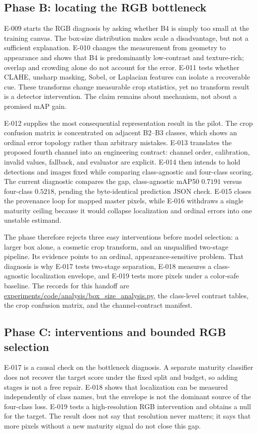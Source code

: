 \documentclass[preprint,12pt]{elsarticle}
\newcommand{\pathcode}[1]{\scriptsize\url{#1}}
\newcommand{\mAP}{mAP}
\begin{document}
\subsection{Phase B: locating the RGB bottleneck}
E-009 starts the RGB diagnosis by asking whether B4 is simply too small at the
training canvas. The box-size distribution makes scale a disadvantage, but
not a sufficient explanation. E-010 changes the measurement from geometry to
appearance and shows that B4 is predominantly low-contrast and texture-rich;
overlap and crowding alone do not account for the error. E-011 tests whether
CLAHE, unsharp masking, Sobel, or Laplacian features can isolate a recoverable
cue. These transforms change measurable crop statistics, yet no transform
result is a detector intervention. The claim remains about mechanism, not
about a promised mAP gain.

E-012 supplies the most consequential representation result in the pilot.
The crop confusion matrix is concentrated on adjacent B2--B3 classes, which
shows an ordinal error topology rather than arbitrary mistakes. E-013 translates
the proposed fourth channel into an engineering contract: channel order,
calibration, invalid values, fallback, and evaluator are explicit. E-014 then
intends to hold detections and images fixed while comparing class-agnostic and
four-class scoring. The current diagnostic compares the gap, class-agnostic
\mAP50 \(0.7191\) versus four-class \(0.5218\), pending the
byte-identical prediction JSON check. E-015 closes the provenance loop for mapped master
pixels, while E-016 withdraws a single maturity ceiling because it would
collapse localization and ordinal errors into one unstable estimand.

The phase therefore rejects three easy interventions before model selection:
a larger box alone, a cosmetic crop transform, and an unqualified two-stage
pipeline. Its evidence points to an ordinal, appearance-sensitive problem.
That diagnosis is why E-017 tests two-stage separation, E-018 measures a
class-agnostic localization envelope, and E-019 tests more pixels under a
color-safe baseline. The records for this handoff are
\pathcode{experiments/code/analysis/box_size_analysis.py}, the class-level contrast tables, the crop
confusion matrix, and the channel-contract manifest.

\subsection{Phase C: interventions and bounded RGB selection}
E-017 is a causal check on the bottleneck diagnosis. A separate maturity
classifier does not recover the target score under the fixed split and
budget, so adding stages is not a free repair. E-018 shows that localization
can be measured independently of class names, but the envelope is not the
dominant source of the four-class loss. E-019 tests a high-resolution RGB
intervention and obtains a null for the target. The result does not say that
resolution never matters; it says that more pixels without a new maturity
signal do not close this gap.
\end{document}
